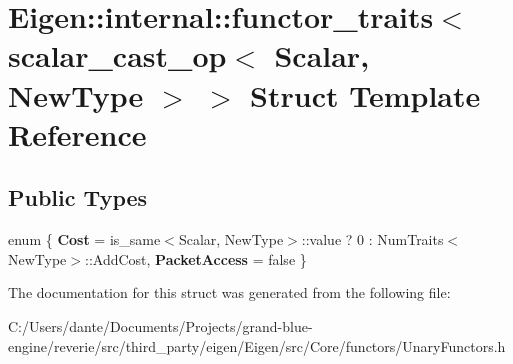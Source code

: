 \hypertarget{struct_eigen_1_1internal_1_1functor__traits_3_01scalar__cast__op_3_01_scalar_00_01_new_type_01_4_01_4}{}\section{Eigen\+::internal\+::functor\+\_\+traits$<$ scalar\+\_\+cast\+\_\+op$<$ Scalar, New\+Type $>$ $>$ Struct Template Reference}
\label{struct_eigen_1_1internal_1_1functor__traits_3_01scalar__cast__op_3_01_scalar_00_01_new_type_01_4_01_4}
\subsection*{Public Types}
\begin{DoxyCompactItemize}
\item 
\mbox{\label{struct_eigen_1_1internal_1_1functor__traits_3_01scalar__cast__op_3_01_scalar_00_01_new_type_01_4_01_4_a08a628fd45f70f64fc9d293731a9bde0}} 
enum \{ {\bfseries Cost} = is\+\_\+same$<$Scalar, New\+Type$>$\+::value ? 0 \+: Num\+Traits$<$New\+Type$>$\+::Add\+Cost, 
{\bfseries Packet\+Access} = false
 \}
\end{DoxyCompactItemize}


The documentation for this struct was generated from the following file\+:\begin{DoxyCompactItemize}
\item 
C\+:/\+Users/dante/\+Documents/\+Projects/grand-\/blue-\/engine/reverie/src/third\+\_\+party/eigen/\+Eigen/src/\+Core/functors/Unary\+Functors.\+h\end{DoxyCompactItemize}

